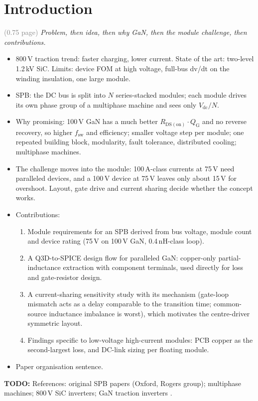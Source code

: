 \documentclass[conference]{IEEEtran}
\newcommand{\plan}[1]{\textcolor{blue!60!black}{\textit{#1}}}
\newcommand{\todo}[1]{\textcolor{red!70!black}{\textbf{TODO:} #1}}
\newcommand{\pages}[1]{\hfill\textcolor{gray}{\small(#1 page)}}
\begin{document}
\section{Introduction}\pages{0.75}
\plan{Problem, then idea, then why GaN, then the module challenge, then contributions.}
\begin{itemize}
\item 800\,V traction trend: faster charging, lower current. State of the art: two-level 1.2\,kV SiC. Limits: device FOM at high voltage, full-bus dv/dt on the winding insulation, one large module.
\item SPB: the DC bus is split into $N$ series-stacked modules; each module drives its own phase group of a multiphase machine and sees only $V_\mathrm{dc}/N$.
\item Why promising: 100\,V GaN has a much better $R_\mathrm{DS(on)}\cdot Q_\mathrm{G}$ and no reverse recovery, so higher $f_\mathrm{sw}$ and efficiency; smaller voltage step per module; one repeated building block, modularity, fault tolerance, distributed cooling; multiphase machines.
\item The challenge moves into the module: 100\,A-class currents at 75\,V need paralleled devices, and a 100\,V device at 75\,V leaves only about 15\,V for overshoot. Layout, gate drive and current sharing decide whether the concept works.
\item Contributions:
 \begin{enumerate}
 \item Module requirements for an SPB derived from bus voltage, module count and device rating (75\,V on 100\,V GaN, 0.4\,nH-class loop).
 \item A Q3D-to-SPICE design flow for paralleled GaN: copper-only partial-inductance extraction with component terminals, used directly for loss and gate-resistor design.
 \item A current-sharing sensitivity study with its mechanism (gate-loop mismatch acts as a delay comparable to the transition time; common-source inductance imbalance is worst), which motivates the centre-driver symmetric layout.
 \item Findings specific to low-voltage high-current modules: PCB copper as the second-largest loss, and DC-link sizing per floating module.
 \end{enumerate}
\item Paper organisation sentence.
\end{itemize}
\todo{References: original SPB papers (Oxford, Rogers group); multiphase machines; 800\,V SiC inverters; GaN traction inverters \cite{cooke2026,gan_module_traction,gan_3level,gan_100kw,gan_scooter,gan_lev}.}
\end{document}
